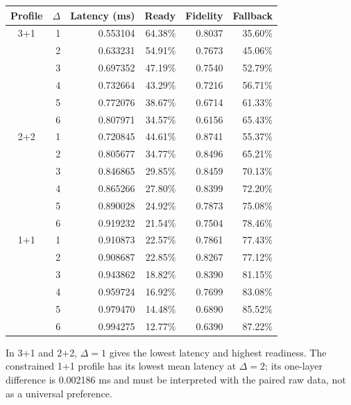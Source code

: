 \documentclass[11pt,a4paper]{report}
\begin{document}
\begin{center}\small
\begin{tabular}{crrrrr}
\toprule Profile & $\Delta$ & Latency (ms) & Ready & Fidelity & Fallback \\
\midrule
3+1 & 1 & 0.553104 & 64.38\% & 0.8037 & 35.60\% \\
 & 2 & 0.633231 & 54.91\% & 0.7673 & 45.06\% \\
 & 3 & 0.697352 & 47.19\% & 0.7540 & 52.79\% \\
 & 4 & 0.732664 & 43.29\% & 0.7216 & 56.71\% \\
 & 5 & 0.772076 & 38.67\% & 0.6714 & 61.33\% \\
 & 6 & 0.807971 & 34.57\% & 0.6156 & 65.43\% \\
\midrule
2+2 & 1 & 0.720845 & 44.61\% & 0.8741 & 55.37\% \\
 & 2 & 0.805677 & 34.77\% & 0.8496 & 65.21\% \\
 & 3 & 0.846865 & 29.85\% & 0.8459 & 70.13\% \\
 & 4 & 0.865266 & 27.80\% & 0.8399 & 72.20\% \\
 & 5 & 0.890028 & 24.92\% & 0.7873 & 75.08\% \\
 & 6 & 0.919232 & 21.54\% & 0.7504 & 78.46\% \\
\midrule
1+1 & 1 & 0.910873 & 22.57\% & 0.7861 & 77.43\% \\
 & 2 & 0.908687 & 22.85\% & 0.8267 & 77.12\% \\
 & 3 & 0.943862 & 18.82\% & 0.8390 & 81.15\% \\
 & 4 & 0.959724 & 16.92\% & 0.7699 & 83.08\% \\
 & 5 & 0.979470 & 14.48\% & 0.6890 & 85.52\% \\
 & 6 & 0.994275 & 12.77\% & 0.6390 & 87.22\% \\
\bottomrule
\end{tabular}
\end{center}
In 3+1 and 2+2, $\Delta=1$ gives the lowest latency and highest readiness.
The constrained 1+1 profile has its lowest mean latency at $\Delta=2$;
its one-layer difference is 0.002186 ms and must be interpreted with the
paired raw data, not as a universal preference.
\end{document}

